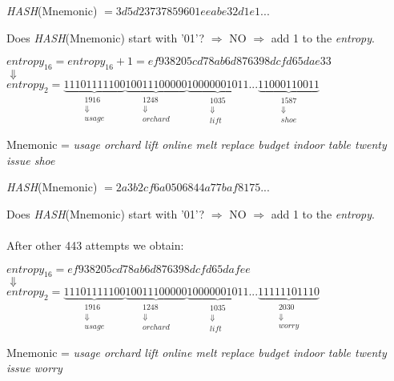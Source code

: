 \begin{center}
	\textit{HASH}(Mnemonic) $= 3d5d23737859601eeabe32d1e1...$
\end{center}
Does \textit{HASH}(Mnemonic) start with '01'? $\Rightarrow$ NO $\Rightarrow$ add 1 to the \textit{entropy}.
\begin{center}
	$entropy_{16} = entropy_{16} + 1  = ef938205cd78ab6d876398dcfd65dae33$
	\\
	$\Downarrow $
	\\
	$entropy_{2}= \underbrace{11101111100}_{\substack{1916 \\ \Downarrow\\ usage} }
	\underbrace{10011100000}_{\substack{1248 \\ \Downarrow\\ orchard}}
	\underbrace{10000001011}_{\substack{1035 \\ \Downarrow\\ lift}}
	...
	\underbrace{11000110011}_{\substack{1587 \\ \Downarrow\\ shoe}}  $
\end{center}
Mnemonic = \textit{usage orchard lift online melt replace budget indoor table twenty issue shoe}

\begin{center}
	\textit{HASH}(Mnemonic) $= 2a3b2cf6a0506844a77baf8175...$
\end{center}
Does \textit{HASH}(Mnemonic) start with '01'? $\Rightarrow$ NO $\Rightarrow$ add 1 to the \textit{entropy}.
\\ \\
After other 443 attempts we obtain:
\begin{center}
	$entropy_{16} =ef938205cd78ab6d876398dcfd65dafee$
	\\
	$\Downarrow $
	\\
	$entropy_{2}= \underbrace{11101111100}_{\substack{1916 \\ \Downarrow\\ usage} }
	\underbrace{10011100000}_{\substack{1248 \\ \Downarrow\\ orchard}}
	\underbrace{10000001011}_{\substack{1035 \\ \Downarrow\\ lift}}
	...
	\underbrace{11111101110}_{\substack{2030 \\ \Downarrow\\ worry}}  $
\end{center}
Mnemonic = \textit{usage orchard lift online melt replace budget indoor table twenty issue worry}

